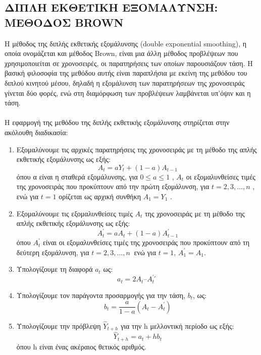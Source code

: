 \subsection{ΔΙΠΛΗ ΕΚΘΕΤΙΚΗ ΕΞΟΜΑΛΥΝΣΗ:  ΜΕΘΟΔΟΣ BROWN}
Η μέθοδος της διπλής εκθετικής εξομάλυνσης (double exponential smoothing), η
οποία ονομάζεται και μέθοδος Brown, είναι μια άλλη μέθοδος προβλέψεων που
χρησιμοποιείται σε χρονοσειρές, οι παρατηρήσεις των οποίων παρουσιάζουν τάση. Η
βασική φιλοσοφία της μεθόδου αυτής είναι παραπλήσια με εκείνη της μεθόδου του
διπλού κινητού μέσου, δηλαδή η εξομάλυνση των παρατηρήσεων της χρονοσειράς
γίνεται δύο φορές, ενώ στη διαμόρφωση των προβλέψεων λαμβάνεται υπ’όψιν και η
τάση.\\\\
Η εφαρμογή της μεθόδου της διπλής εκθετικής εξομάλυνσης στηρίζεται στην
ακόλουθη διαδικασία:\\
\begin{enumerate}
\item  Εξομαλύνουμε τις αρχικές παρατηρήσεις της χρονοσειράς με τη μέθοδο της απλής
εκθετικής εξομάλυνσης ως εξής:\\
$$ A_t=aY_t + \left(1-a\right) A_{t-1} $$
όπου α είναι η σταθερά εξομάλυνσης, για $ 0 \leq a \leq 1 $ , $ A_t $ οι εξομαλυνθείσες τιμές της
χρονοσειράς που προκύπτουν από την πρώτη εξομάλυνση, για $ t = 2,3,\ldots,n $ , ενώ για
$t=1$ ορίζεται ως αρχική συνθήκη $ A_1 = Y_1 $ .

\item Εξομαλύνουμε τις εξομαλυνθείσες τιμές $A_t$ της χρονοσειράς με τη μέθοδο της
απλής εκθετικής εξομάλυνσης ως εξής:\\
$$ A^{'}_t=aA_t + \left(1-a\right) A^{'}_{t-1} $$
όπου $A^{'}_t$ είναι οι εξομαλυνθείσες τιμές της χρονοσειράς που προκύπτουν από τη
δεύτερη εξομάλυνση, για $t = 2,3,\dots,n\:$ ενώ για $t=1$, $A^{'}_1 =A_1$.

\item Υπολογίζουμε τη διαφορά $a_t$ ως:
$$a_t = 2 A_t – A^{'}_t ́$$

\item Υπολογίζουμε τον παράγοντα προσαρμογής για την τάση, $b_t$, ως:\\
$$ b_t=\frac{a}{1-a} \left(A_t - A^{'}_t \right) $$

\item Υπολογίζουμε την πρόβλεψη $ \widehat{Y}_{t+h} $ για την h μελλοντική περίοδο ως εξής:\\
$$ \widehat{Y}_{t+h}=a_t+hb_t  $$
όπου h είναι ένας ακέραιος θετικός αριθμός.\\
 
\end{enumerate}

